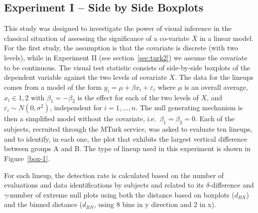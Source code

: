 \documentclass[12pt]{article}\usepackage[]{graphicx}\usepackage[]{color}
\newcommand{\hh}[1]{{\color{magenta} #1}}
\begin{document}
\subsection{Experiment I -- Side by Side Boxplots}\label{sec:turk1}
This study was designed to investigate the power of visual inference in the classical situation of assessing the significance of a co-variate $X$ in a linear model. For the first study, the assumption is that the covariate is discrete (with two levels), while in  Experiment II (see section~\ref{sec:turk2}) we assume the covariate to be continuous. 
The visual test statistic consists of side-by-side boxplots of the dependent variable against the two levels of covariate $X$. The data for the lineups comes from a model of the form $y_{i} = \mu + \beta {x_i} + \varepsilon_{i}$ where $\mu$ is an overall average, $x_i \in {1, 2}$ with $\beta_1 = -\beta_2$ is the effect for each of the two levels of $X$, and $\varepsilon_{i} \sim N(0, \sigma^2)$, independent for $i = 1, ..., n$.
The null generating mechanism is then a simplified model without the covariate, i.e.\ $\beta_1 = \beta_2 = 0$. 
Each of the subjects, recruited through the MTurk service, was asked to evaluate ten lineups, and to identify, in each one, the plot that exhibits the largest vertical difference between groups A and B. 
The type of lineup used in this experiment is shown in Figure~\ref{box-1}.




For each lineup, the detection rate is calculated based on the number of evaluations and data identifications by subjects and related to its $\delta$-difference and $\gamma$-number of extreme null plots using both the distance based on boxplots ($d_{BX}$) and the binned distance ($d_{BN}$, using 8 bins in y direction and 2 in x).  
\end{document}
